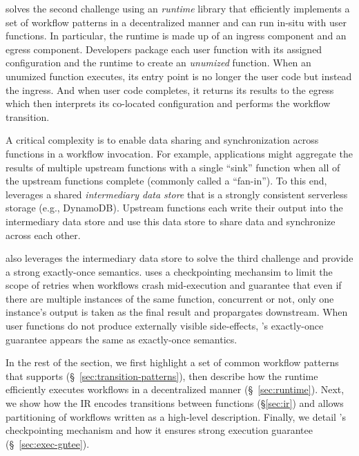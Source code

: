 \name{} solves the second challenge using an \textit{\name{} runtime} library
that efficiently implements a set of workflow patterns in a decentralized manner
and can run in-situ with user functions. In particular, the \name{} runtime is
made up of an ingress component and an egress component.  Developers package
each user function with its assigned \name{} configuration and the \name{}
runtime to create an \emph{unumized} function. When an unumized function
executes, its entry point is no longer the user code but instead the \name{}
ingress. And when user code completes, it returns its results to the \name{}
egress which then interprets its co-located \name{} configuration and performs
the workflow transition.

A critical complexity is to enable data sharing and synchronization across
functions in a workflow invocation. For example, applications might aggregate
the results of multiple upstream functions with a single ``sink'' function
when all of the upstream functions complete (commonly called a ``fan-in''). To
this end, \name{} leverages a shared \emph{intermediary data store} that is a
strongly consistent serverless storage (e.g., DynamoDB). Upstream functions
each write their output into the intermediary data store and use this data
store to share data and  synchronize across each other.


\name{} also leverages the intermediary data store to solve the third
challenge and provide a strong exactly-once semantics. \name{} uses a
checkpointing mechansim to limit the scope of retries when workflows crash
mid-execution and guarantee that even if there are multiple instances of the
same function, concurrent or not, only one instance's output is taken as the
final result and propargates downstream. When user functions do not produce
externally visible side-effects, \name{}'s exactly-once guarantee appears the
same as exactly-once semantics.

In the rest of the section, we first highlight a set of common workflow
patterns that \name{} supports (\S~\ref{sec:transition-patterns}), then
describe how the \name{} runtime efficiently executes workflows in a
decentralized manner (\S~\ref{sec:runtime}). Next, we show how the \name{} IR
encodes transitions between functions (\S\ref{sec:ir}) and allows partitioning
of workflows written as a high-level description. Finally, we detail \name{}'s
checkpointing mechanism and how it ensures strong execution guarantee
(\S~\ref{sec:exec-gntee}).










